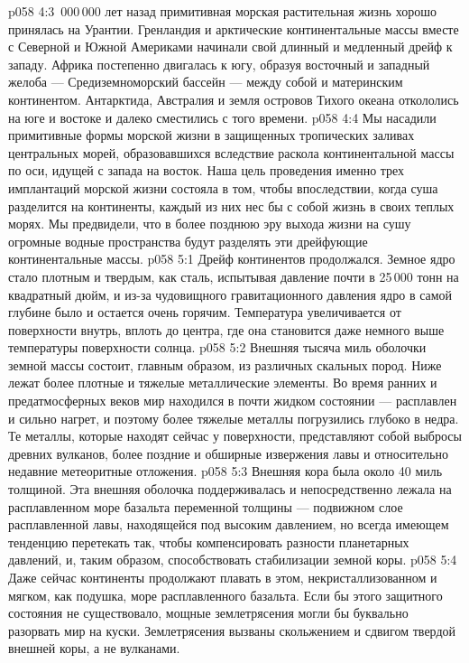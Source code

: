 \vs p058 4:3 \,000\,000 лет назад примитивная морская растительная жизнь хорошо принялась на Урантии. Гренландия и арктические континентальные массы вместе с Северной и Южной Америками начинали свой длинный и медленный дрейф к западу. Африка постепенно двигалась к югу, образуя восточный и западный желоба --- Средиземноморский бассейн --- между собой и материнским континентом. Антарктида, Австралия и земля островов Тихого океана откололись на юге и востоке и далеко сместились с того времени.
\vs p058 4:4 Мы насадили примитивные формы морской жизни в защищенных тропических заливах центральных морей, образовавшихся вследствие раскола континентальной массы по оси, идущей с запада на восток. Наша цель проведения именно трех имплантаций морской жизни состояла в том, чтобы впоследствии, когда суша разделится на континенты, каждый из них нес бы с собой жизнь в своих теплых морях. Мы предвидели, что в более позднюю эру выхода жизни на сушу огромные водные пространства будут разделять эти дрейфующие континентальные массы.
\vs p058 5:1 Дрейф континентов продолжался. Земное ядро стало плотным и твердым, как сталь, испытывая давление почти в 25\,000 тонн на квадратный дюйм, и из\hyp{}за чудовищного гравитационного давления ядро в самой глубине было и остается очень горячим. Температура увеличивается от поверхности внутрь, вплоть до центра, где она становится даже немного выше температуры поверхности солнца.
\vs p058 5:2 Внешняя тысяча миль оболочки земной массы состоит, главным образом, из различных скальных пород. Ниже лежат более плотные и тяжелые металлические элементы. Во время ранних и предатмосферных веков мир находился в почти жидком состоянии --- расплавлен и сильно нагрет, и поэтому более тяжелые металлы погрузились глубоко в недра. Те металлы, которые находят сейчас у поверхности, представляют собой выбросы древних вулканов, более поздние и обширные извержения лавы и относительно недавние метеоритные отложения.
\vs p058 5:3 Внешняя кора была около 40 миль толщиной. Эта внешняя оболочка поддерживалась и непосредственно лежала на расплавленном море базальта переменной толщины --- подвижном слое расплавленной лавы, находящейся под высоким давлением, но всегда имеющем тенденцию перетекать так, чтобы компенсировать разности планетарных давлений, и, таким образом, способствовать стабилизации земной коры.
\vs p058 5:4 Даже сейчас континенты продолжают плавать в этом, некристаллизованном и мягком, как подушка, море расплавленного базальта. Если бы этого защитного состояния не существовало, мощные землетрясения могли бы буквально разорвать мир на куски. Землетрясения вызваны скольжением и сдвигом твердой внешней коры, а не вулканами.
